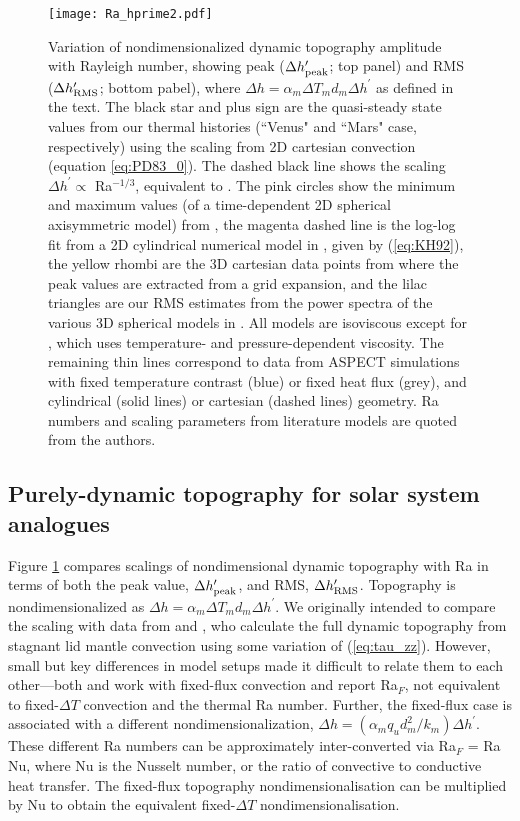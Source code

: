 \begin{figure}
  \centering
  \texttt{[image: Ra\_hprime2.pdf]}
\caption{Variation of nondimensionalized dynamic topography amplitude with Rayleigh number, showing peak ($\Delta h^\prime_{\rm peak}$; top panel) and RMS ($\Delta h^\prime_{\rm RMS}$; bottom pabel), where $\Delta h = \alpha_m \Delta T_m d_m \Delta h^\prime$ as defined in the text. The black star and plus sign are the quasi-steady state values from our thermal histories (``Venus" and ``Mars" case, respectively) using the \citet{Parsons1983} scaling from 2D cartesian convection (equation \ref{eq:PD83_0}). The dashed black line shows the scaling $\Delta h^\prime \propto$ Ra$^{-1/3}$, equivalent to \citet{Parsons1983}. The pink circles show the minimum and maximum values (of a time-dependent 2D spherical axisymmetric model) from \citet{Kiefer1998}, the magenta dashed line is the log-log fit from a 2D cylindrical numerical model in \citet{Kiefer1992}, given by (\ref{eq:KH92}), the yellow rhombi are the 3D cartesian data points from \citet{Lees2019} where the peak values are extracted from a grid expansion, and the lilac triangles are our RMS estimates from the power spectra of the various 3D spherical models in \citet{Huang2013}. All models are isoviscous except for \citet{Huang2013}, which uses temperature- and pressure-dependent viscosity. The remaining thin lines correspond to data from ASPECT simulations with fixed temperature contrast (blue) or fixed heat flux (grey), and cylindrical (solid lines) or cartesian (dashed lines) geometry. Ra numbers and scaling parameters from literature models are quoted from the authors.}
\label{fig:RMS_benchmark}
\end{figure}


\subsection{Purely-dynamic topography for solar system analogues}\label{sec:results-comparison}


Figure \ref{fig:RMS_benchmark} compares scalings of nondimensional dynamic topography with Ra in terms of both the peak value, $\Delta h^\prime_{\rm peak}$, and RMS, $\Delta h^\prime_{\rm RMS}$. Topography is nondimensionalized as $\Delta h = \alpha_m \Delta T_m d_m \Delta h^\prime$. We originally intended to compare the \citet{Parsons1983} scaling with data from \citet{Nimmo1996} and \citet{Moresi1995}, who calculate the full dynamic topography from stagnant lid mantle convection using some variation of (\ref{eq:tau_zz}). However, small but key differences in model setups made it difficult to relate them to each other---both \citet{Nimmo1996} and \citet{Moresi1995} work with fixed-flux convection and report Ra$_F$, not equivalent to fixed-$\Delta T$ convection and the thermal Ra number. Further, the fixed-flux case is associated with a different nondimensionalization, $\Delta h = ( \alpha_m q_u d_m^2 / k_m) \Delta h^\prime$. These different Ra numbers can be approximately inter-converted via Ra$_F$ = Ra Nu, where Nu is the Nusselt number, or the ratio of convective to conductive heat transfer. The fixed-flux topography nondimensionalisation can be multiplied by Nu to obtain the equivalent fixed-$\Delta T$ nondimensionalisation. 

